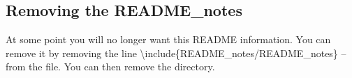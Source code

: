 \subsection{Removing the README\_notes}
At some point you will no longer want this README information. You can remove it by removing the line
\textbackslash include\{README\_notes/README\_notes\} -- from the  file. You can then remove the  directory.

\clearpage
\printglossary[type=readme,toctitle={README acronyms}]
\clearpage
